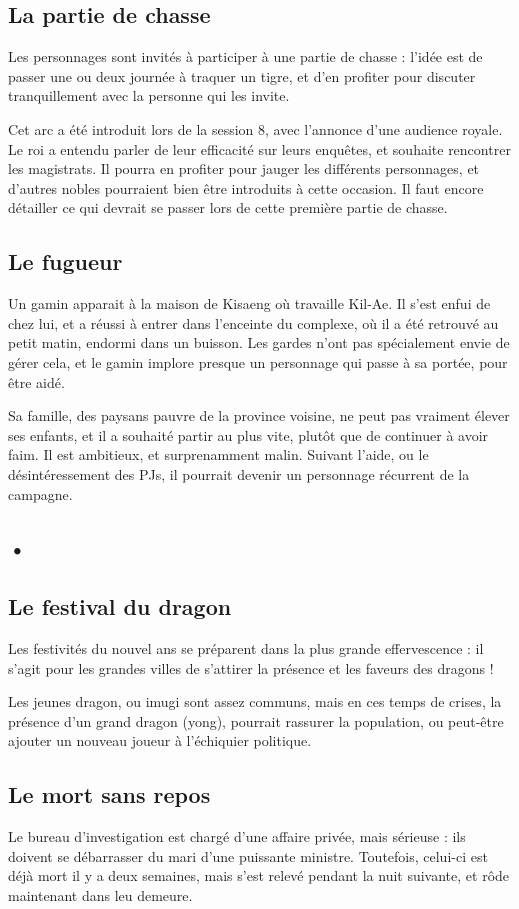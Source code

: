 \documentclass[10pt,a4paper]{book}
\begin{document}
\subsection{La partie de chasse}
Les personnages sont invités à participer à une partie de chasse : l'idée est de passer une ou deux journée à traquer un tigre, et d'en profiter pour discuter tranquillement avec la personne qui les invite.

Cet arc a été introduit lors de la session 8, avec l'annonce d'une audience royale. Le roi a entendu parler de leur efficacité sur leurs enquêtes, et souhaite rencontrer les magistrats. Il pourra en profiter pour jauger les différents personnages, et d'autres nobles pourraient bien être introduits à cette occasion. Il faut encore détailler ce qui devrait se passer lors de cette première partie de chasse.
\subsection{Le fugueur}
Un gamin apparait à la maison de Kisaeng où travaille Kil-Ae. Il s'est enfui de chez lui, et a réussi à entrer dans l'enceinte du complexe, où il a été retrouvé au petit matin, endormi dans un buisson. Les gardes n'ont pas spécialement envie de gérer cela, et le gamin implore presque un personnage qui passe à sa portée, pour être aidé. 

Sa famille, des paysans pauvre de la province voisine, ne peut pas vraiment élever ses enfants, et il a souhaité partir au plus vite, plutôt que de continuer à avoir faim. Il est ambitieux, et surprenamment malin. Suivant l'aide, ou le désintéressement des PJs, il pourrait devenir un personnage récurrent de la campagne.

\subsection{•}
\subsection{Le festival du dragon}
Les festivités du nouvel ans se préparent dans la plus grande effervescence : il s'agit pour les grandes villes de s'attirer la présence et les faveurs des dragons !

Les jeunes dragon, ou imugi sont assez communs, mais en ces temps de crises, la présence d'un grand dragon (yong), pourrait rassurer la population, ou peut-être ajouter un nouveau joueur à l'échiquier politique.
\subsection{Le mort sans repos}
Le bureau d'investigation est chargé d'une affaire privée, mais sérieuse : ils doivent se débarrasser du mari d'une puissante ministre. Toutefois, celui-ci est déjà mort il y a deux semaines, mais s'est relevé pendant la nuit suivante, et rôde maintenant dans leu demeure.
\end{document}
